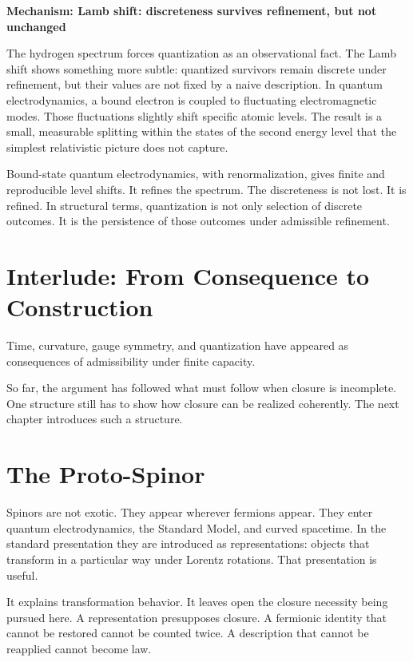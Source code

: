 \documentclass[11pt,twoside,openright]{book}
\newenvironment{mechanismbox}[1]
  {\begin{framed}\noindent\textbf{Mechanism: #1}\par\medskip}
  {\end{framed}}
\begin{document}
\begin{mechanismbox}{Lamb shift: discreteness survives refinement, but not unchanged}

The hydrogen spectrum forces quantization as an observational fact. The Lamb shift shows something more subtle: quantized survivors remain discrete under refinement, but their values are not fixed by a naive description. In quantum electrodynamics, a bound electron is coupled to fluctuating electromagnetic modes. Those fluctuations slightly shift specific atomic levels. The result is a small, measurable splitting within the states of the second energy level that the simplest relativistic picture does not capture.

Bound-state quantum electrodynamics, with renormalization, gives finite and reproducible level shifts. It refines the spectrum. The discreteness is not lost. It is refined. In structural terms, quantization is not only selection of discrete outcomes. It is the persistence of those outcomes under admissible refinement.

\end{mechanismbox}

\clearpage
{%
  \let\cleardoublepage\clearpage
 \chapter{Interlude: From Consequence to Construction}
}
Time, curvature, gauge symmetry, and quantization
have appeared as consequences
of admissibility under finite capacity.

So far, the argument has followed what must follow when closure is incomplete. One structure still has to show how closure can be realized coherently. The next chapter introduces such a structure.

\chapter{The Proto-Spinor}

Spinors are not exotic. They appear wherever fermions appear. They enter quantum electrodynamics, the Standard Model, and curved spacetime. In the standard presentation they are introduced as representations: objects that transform in a particular way under Lorentz rotations. That presentation is useful.

It explains transformation behavior. It leaves open the closure necessity being pursued here. A representation presupposes closure. A fermionic identity that cannot be restored cannot be counted twice. A description that cannot be reapplied cannot become law.
\end{document}
